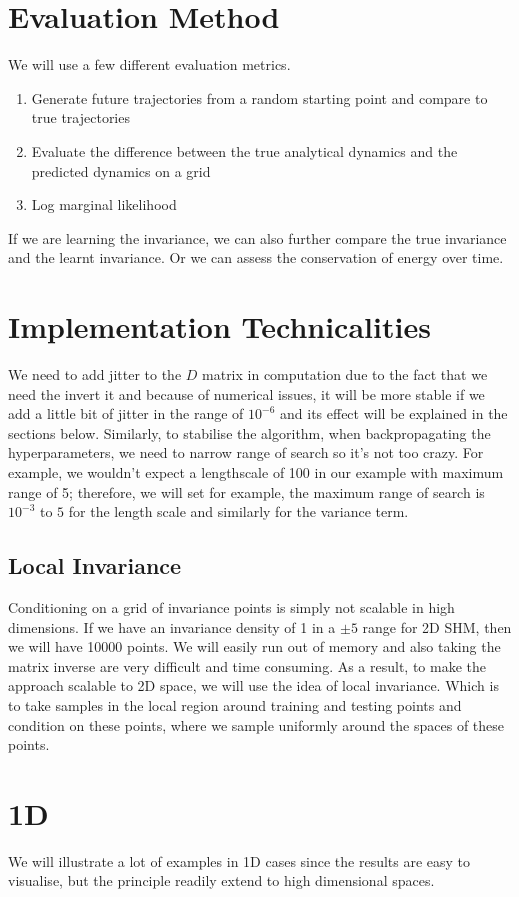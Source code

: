 \documentclass{statsmsc}
\begin{document}
\section{Evaluation Method}
We will use a few different evaluation metrics. 
\begin{enumerate}
    \item Generate future trajectories from a random starting point and compare to true trajectories
    \item Evaluate the difference between the true analytical dynamics and the predicted dynamics on a grid
    \item Log marginal likelihood
\end{enumerate}
If we are learning the invariance, we can also further compare the true invariance and the learnt invariance.
Or we can assess the conservation of energy over time.

\section{Implementation Technicalities}
We need to add jitter to the $D$ matrix in computation due to the fact that we need the invert it and because of numerical issues, it will be more stable if we add a little bit of jitter in the range of $10^{-6}$ and its effect will be explained in the sections below.
Similarly, to stabilise the algorithm, when backpropagating the hyperparameters, we need to narrow range of search so it's not too crazy. 
For example, we wouldn't expect a lengthscale of 100 in our example with maximum range of 5; therefore, we will set for example, the maximum range of search is $10^{-3}$ to $5$ for the length scale and similarly for the variance term.
\subsection{Local Invariance}
Conditioning on a grid of invariance points is simply not scalable in high dimensions. 
If we have an invariance density of 1 in a $\pm 5$ range for 2D SHM, then we will have 10000 points. 
We will easily run out of memory and also taking the matrix inverse are very difficult and time consuming.
As a result, to make the approach scalable to 2D space, we will use the idea of local invariance. 
Which is to take samples in the local region around training and testing points and condition on these points, where we sample uniformly around the spaces of these points.

\section{1D}
We will illustrate a lot of examples in 1D cases since the results are easy to visualise, but the principle readily extend to high dimensional spaces. 
\end{document}
